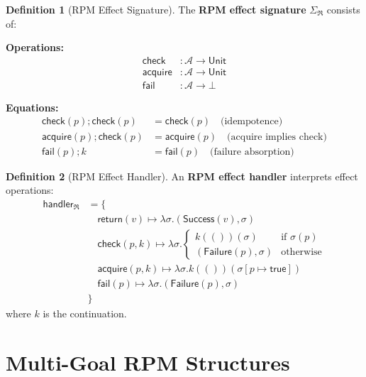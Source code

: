 \documentclass[11pt,twoside,openright]{book}
\theoremstyle{definition}
\newtheorem{definition}{Definition}[chapter]
\theoremstyle{plain}
\theoremstyle{remark}
\newcommand{\Acquisitions}{\mathcal{A}}
\newcommand{\RPM}{\mathfrak{R}}
\begin{document}
\begin{definition}[RPM Effect Signature]
\label{def:rpm-effect-sig}
The \textbf{RPM effect signature} $\Sigma_\RPM$ consists of:

\textbf{Operations:}
\begin{align}
\mathsf{check} &: \Acquisitions \to \mathsf{Unit} \\
\mathsf{acquire} &: \Acquisitions \to \mathsf{Unit} \\
\mathsf{fail} &: \Acquisitions \to \bot
\end{align}

\textbf{Equations:}
\begin{align}
\mathsf{check}(p); \mathsf{check}(p) &= \mathsf{check}(p) \quad \text{(idempotence)} \\
\mathsf{acquire}(p); \mathsf{check}(p) &= \mathsf{acquire}(p) \quad \text{(acquire implies check)} \\
\mathsf{fail}(p); k &= \mathsf{fail}(p) \quad \text{(failure absorption)}
\end{align}
\end{definition}

\begin{definition}[RPM Effect Handler]
\label{def:rpm-handler}
An \textbf{RPM effect handler} interprets effect operations:
\begin{align}
\mathsf{handler}_\RPM &= \{ \\
&\quad \mathsf{return}(v) \mapsto \lambda\sigma. (\mathsf{Success}(v), \sigma) \\
&\quad \mathsf{check}(p, k) \mapsto \lambda\sigma.
  \begin{cases}
    k(())(\sigma) & \text{if } \sigma(p) \\
    (\mathsf{Failure}(p), \sigma) & \text{otherwise}
  \end{cases} \\
&\quad \mathsf{acquire}(p, k) \mapsto \lambda\sigma. k(())(\sigma[p \mapsto \mathsf{true}]) \\
&\quad \mathsf{fail}(p) \mapsto \lambda\sigma. (\mathsf{Failure}(p), \sigma) \\
&\}
\end{align}
where $k$ is the continuation.
\end{definition}

\section{Multi-Goal RPM Structures}
\label{sec:rpm-multigoal}
\end{document}
